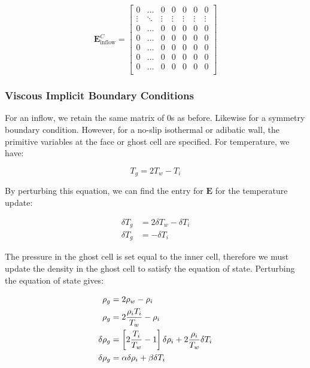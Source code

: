 \documentclass[10pt]{article}
\begin{document}
\begin{flushleft}
\begin{equation*}
    \boldsymbol{E}_\text{inflow}^C = \begin{bmatrix}
        0 & \dots & 0 & 0 & 0 & 0 & 0 \\
        \vdots & \ddots & \vdots & \vdots & \vdots & \vdots & \vdots \\
        0 & \dots & 0 & 0 & 0 & 0 & 0 \\
        0 & \dots & 0 & 0 & 0 & 0 & 0 \\
        0 & \dots & 0 & 0 & 0 & 0 & 0 \\
        0 & \dots & 0 & 0 & 0 & 0 & 0 \\
        0 & \dots & 0 & 0 & 0 & 0 & 0 \\
    \end{bmatrix}
\end{equation*}

\subsubsection{Viscous Implicit Boundary Conditions}

For an inflow, we retain the same matrix of 0s as before. Likewise for a symmetry boundary condition. However, for a no-slip isothermal or adibatic wall, the primitive variables at the face or ghost cell are specified. For temperature, we have:

\begin{equation*}
    T_g = 2 T_w - T_i
\end{equation*}

By perturbing this equation, we can find the entry for $\boldsymbol{E}$ for the temperature update:

\begin{align*}
    \delta T_g &= 2 \delta T_w - \delta T_i \\
    \delta T_g &= -\delta T_i    
\end{align*}

The pressure in the ghost cell is set equal to the inner cell, therefore we must update the density in the ghost cell to satisfy the equation of state. Perturbing the equation of state gives:

\begin{align*}
    \rho_g &= 2 \rho_w - \rho_i\\
    \rho_g &= 2 \frac{\rho_i T_i}{T_w} - \rho _i\\
    \delta \rho_g &=  \left[ 2 \frac{T_i}{T_w} - 1 \right] \delta \rho_i + 2  \frac{\rho_i}{T_w} \delta T_i \\
    \delta \rho_g &=  \alpha \delta \rho_i + \beta \delta T_i 
\end{align*}


\end{flushleft}
\end{document}
